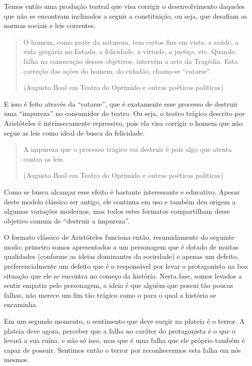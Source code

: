 Temos então uma produção teatral que visa corrigir o desenvolvimento daqueles que não se encontram inclinados a seguir a constituição, ou seja, que desafiam as normas sociais e leis correntes.

\begin{quote}
O homem, como parte da natureza, tem certos fins em vista: a saúde, a vida gregária no Estado, a felicidade, a virtude, a justiça, etc. Quando falha na consecução desses objetivos, intervém a arte da Tragédia. Esta correção das ações do homem, do cidadão, chama-se “catarse”.

(Augusto Boal em Teatro do Oprimido e outras poéticas políticas)
\end{quote}

E isso é feito através da “catarse”, que é exatamente esse processo de destruir uma “impureza” no consumidor do teatro. Ou seja, o teatro trágico descrito por Aristóteles é intrinsecamente repressivo, pois ela visa corrigir o homem que não segue as leis como ideal de busca da felicidade.

\begin{quote}
A impureza que o processo trágico vai destruir é pois algo que atenta contra as leis.

(Augusto Boal em Teatro do Oprimido e outras poéticas políticas)
\end{quote}

Como se busca alcançar esse efeito é bastante interessante e educativo. Apesar deste modelo clássico ser antigo, ele continua em uso e também deu origem a algumas variações modernas, mas todos estes formatos compartilham desse objetivo comum de “destruir a impureza”.

O formato clássico de Aristóteles funciona então, resumidamente do seguinte modo: primeiro somos apresentados a um personagem que é dotado de muitas qualidades (conforme as ideias dominantes da sociedade) e apenas um defeito, preferencialmente um defeito que é o responsável por levar o protagonista na boa situação que ele se encontra no começo da história. Nesta fase, somos levados a sentir empatia pelo personagem, a ideia é que alguém que possui tão poucas falhas, não merece um fim tão trágico como o para o qual a história se encaminha.

Em um segundo momento, o sentimento que deve surgir na plateia é o terror. A plateia deve agora, perceber que a falha no caráter do protagonista é o que o levará a sua ruína, e não só isso, mas que é uma falha que ele próprio também é capaz de possuir. Sentimos então o terror por reconhecermos esta falha em nós mesmos.


